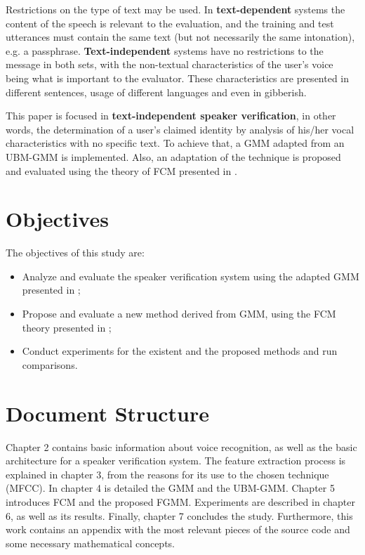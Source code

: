 Restrictions on the type of text may be used. In \textbf{text-dependent} systems the content of the speech is relevant to the evaluation, and the training and test utterances must contain the same text (but not necessarily the same intonation), e.g. a passphrase. \textbf{Text-independent} systems have no restrictions to the message in both sets, with the non-textual characteristics of the user's voice being what is important to the evaluator. These characteristics are presented in different sentences, usage of different languages and even in gibberish.

This paper is focused in \textbf{text-independent speaker verification}, in other words, the determination of a user's claimed identity by analysis of his/her vocal characteristics with no specific text. To achieve that, a GMM adapted from an UBM-GMM \autocite{reynolds.quatieri.dunn.2000} is implemented. Also, an adaptation of the technique is proposed and evaluated using the theory of FCM presented in \autocite{gao.zhou.pu.2013}.

\section{Objectives}

The objectives of this study are:

\begin{itemize}\itemsep0pt
    \item Analyze and evaluate the speaker verification system using the adapted GMM presented in \autocite{reynolds.quatieri.dunn.2000};
    \item Propose and evaluate a new method derived from GMM, using the FCM theory presented in \autocite{gao.zhou.pu.2013};
    \item Conduct experiments for the existent and the proposed methods and run comparisons.
\end{itemize}

\section{Document Structure}

Chapter 2 contains basic information about voice recognition, as well as the basic architecture for a speaker verification system. The feature extraction process is explained in chapter 3, from the reasons for its use to the chosen technique (MFCC). In chapter 4 is detailed the GMM and the UBM-GMM. Chapter 5 introduces FCM and the proposed FGMM. Experiments are described in chapter 6, as well as its results. Finally, chapter 7 concludes the study. Furthermore, this work contains an appendix with the most relevant pieces of the source code and some necessary mathematical concepts.